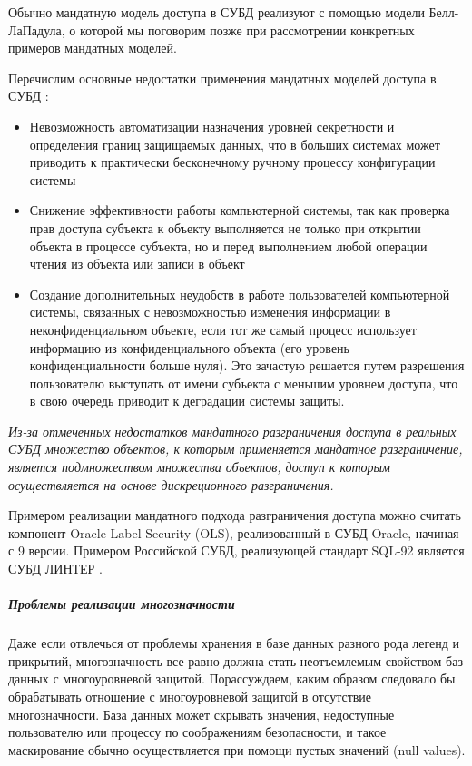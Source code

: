 Обычно мандатную модель доступа в СУБД реализуют с помощью модели Белл-ЛаПадула, о которой мы поговорим позже 
при рассмотрении конкретных примеров мандатных моделей.

Перечислим основные недостатки применения мандатных моделей доступа в СУБД \autocite{Skakun}:
\begin{itemize}
    \item Невозможность автоматизации назначения уровней секретности и определения границ защищаемых данных, 
    что в больших системах может приводить к практически бесконечному ручному процессу конфигурации системы
    \item Снижение эффективности работы компьютерной системы, так как проверка прав доступа субъекта к объекту 
    выполняется не только при открытии объекта в процессе субъекта, но и перед выполнением любой операции 
    чтения из объекта или записи в объект
    \item Создание дополнительных неудобств в работе пользователей компьютерной системы, связанных с 
    невозможностью изменения информации в неконфиденциальном объекте, если тот же самый процесс использует 
    информацию из конфиденциального объекта (его уровень конфиденциальности больше нуля). Это зачастую
    решается путем разрешения пользователю выступать от имени субъекта с меньшим уровнем доступа, что в 
    свою очередь приводит к деградации системы защиты.
\end{itemize}

\textit{Из-за отмеченных недостатков мандатного разграничения доступа в реальных СУБД множество объектов, к которым 
применяется мандатное разграничение, является подмножеством множества объектов, доступ к которым осуществляется 
на основе дискреционного разграничения.}

Примером реализации мандатного подхода разграничения доступа можно считать компонент Oracle Label Security (OLS), 
реализованный в СУБД Oracle, начиная с 9 версии. Примером Российской СУБД, реализующей стандарт SQL-92 является 
СУБД ЛИНТЕР \autocite{Skakun}.

\subparagraph{Проблемы реализации многозначности}

Даже если отвлечься от проблемы хранения в базе данных разного рода легенд и прикрытий, многозначность все равно должна стать неотъемлемым свойством баз данных с многоуровневой защитой. Порассуждаем, каким образом следовало бы обрабатывать отношение с многоуровневой защитой в отсутствие многозначности. База данных может скрывать значения, недоступные пользователю или процессу по соображениям безопасности, и такое маскирование обычно осуществляется при помощи пустых значений (null values).

